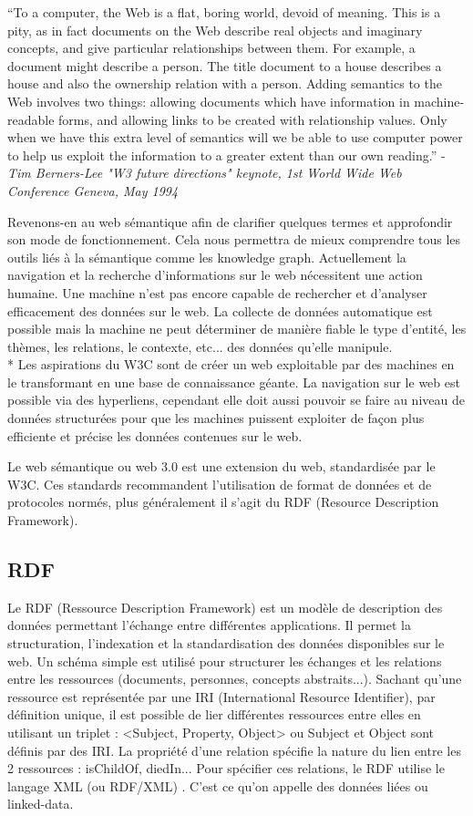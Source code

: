 \enquote{To a computer, the Web is a flat, boring world, devoid of meaning. This is a pity, as in fact documents on the Web describe real objects and imaginary concepts, and give particular relationships between them. For example, a document might describe a person. The title document to a house describes a house and also the ownership relation with a person. Adding semantics to the Web involves two things: allowing documents which have information in machine-readable forms, and allowing links to be created with relationship values. Only when we have this extra level of semantics will we be able to use computer power to help us exploit the information to a greater extent than our own reading.} - \textit{Tim Berners-Lee "W3 future directions" keynote, 1st World Wide Web Conference Geneva, May 1994} \cite{tim}

Revenons-en au web sémantique afin de clarifier quelques termes et approfondir son mode de fonctionnement. Cela nous permettra de mieux comprendre tous les outils liés à la sémantique comme les knowledge graph. Actuellement la navigation et la recherche d'informations sur le web nécessitent une action humaine. Une machine n'est pas encore capable de rechercher et d'analyser efficacement des données sur le web. La collecte de données automatique est possible mais la machine ne peut déterminer de manière fiable le type d'entité, les thèmes, les relations, le contexte, etc... des données qu'elle manipule.
\\*
Les aspirations du W3C sont de créer un web exploitable par des machines en le transformant en une base de connaissance géante.
La navigation sur le web est possible via des hyperliens, cependant elle doit aussi pouvoir se faire au niveau de données structurées pour que les machines puissent exploiter de façon plus efficiente et précise les données contenues sur le web.

Le web sémantique ou web 3.0 est une extension du web, standardisée par le W3C. Ces standards recommandent l'utilisation de format de données et de protocoles normés, plus généralement il s'agit du RDF (Resource Description Framework).

\subsection{RDF}

Le RDF (Ressource Description Framework) est un modèle de description des données permettant l'échange entre différentes applications. Il permet la structuration, l'indexation et la standardisation des données disponibles sur le web. Un schéma simple est utilisé pour structurer les échanges et les relations entre les ressources (documents, personnes, concepts abstraits...). Sachant qu'une ressource est représentée par une IRI (International Resource Identifier), par définition unique, il est possible de lier différentes ressources entre elles en utilisant un triplet : <Subject, Property, Object> ou Subject et Object sont définis par des IRI. La propriété d'une relation spécifie la nature du lien entre les 2 ressources : isChildOf, diedIn... Pour spécifier ces relations, le RDF utilise le langage XML (ou RDF/XML) \cite{rdf}. C'est ce qu'on appelle des données liées ou linked-data.

